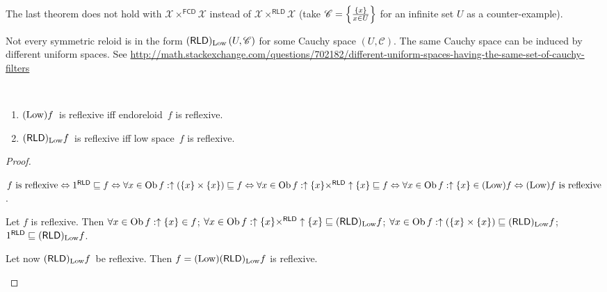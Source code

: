 \begin{rem}
  The last theorem does not hold with $\mathcal{X}
  \times^{\mathsf{FCD}} \mathcal{X}$ instead of $\mathcal{X}
  \times^{\mathsf{RLD}} \mathcal{X}$ (take $\mathscr{C} = \left\{ \frac{ \{ x
  \} }{x \in U}\right\}$ for an infinite set $U$ as a counter-example).
\end{rem}

\begin{rem}
  Not every symmetric reloid is in the form
  $(\mathsf{RLD})_{\operatorname{Low}} \left( U , \mathscr{C} \right)$ for some
  Cauchy space $\left( U , \mathscr{C} \right)$. The same Cauchy space can be
  induced by different uniform spaces. See
  \url{http://math.stackexchange.com/questions/702182/different-uniform-spaces-having-the-same-set-of-cauchy-filters}
\end{rem}

\begin{prop}
~
\begin{enumerate}
\item \label{low-rld-relf}$(\operatorname{Low})f$~is reflexive iff endoreloid~$f$ is reflexive.
\item \label{rld-low-relf}$(\mathsf{RLD})_{\operatorname{Low}}f$~is reflexive iff low space~$f$ is reflexive.
\end{enumerate}
\end{prop}

\begin{proof}
~
\begin{widedisorder}
\item[\ref{low-rld-relf}] $\text{$f$ is reflexive} \Leftrightarrow
  1^{\mathsf{RLD}}\sqsubseteq f  \Leftrightarrow \forall x\in\operatorname{Ob} f:\uparrow(\{x\}\times\{x\})\sqsubseteq f \Leftrightarrow
  \forall x\in\operatorname{Ob} f:\uparrow\{x\}\times^{\mathsf{RLD}}\uparrow\{x\}\sqsubseteq f \Leftrightarrow
  \forall x\in\operatorname{Ob} f:\uparrow\{x\}\in(\operatorname{Low})f \Leftrightarrow \text{$(\operatorname{Low})f$~is reflexive}$.

\item[\ref{rld-low-relf}] Let $f$ is reflexive. Then $\forall x\in\operatorname{Ob} f:\uparrow\{x\}\in f$;
  $\forall x\in\operatorname{Ob} f:\uparrow\{x\}\times^{\mathsf{RLD}}\uparrow\{x\}\sqsubseteq(\mathsf{RLD})_{\operatorname{Low}}f$;
  $\forall x\in\operatorname{Ob} f:\uparrow(\{x\}\times\{x\})\sqsubseteq(\mathsf{RLD})_{\operatorname{Low}}f$;
  $1^{\mathsf{RLD}}\sqsubseteq(\mathsf{RLD})_{\operatorname{Low}}f$.
  
  Let now $(\mathsf{RLD})_{\operatorname{Low}}f$~be reflexive. Then $f = (\operatorname{Low})(\mathsf{RLD})_{\operatorname{Low}}f$ is reflexive.
\end{widedisorder}
\end{proof}

